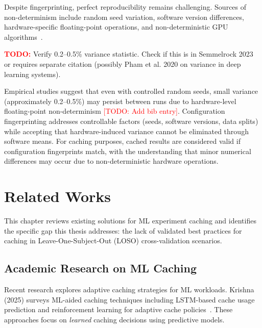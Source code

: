 \documentclass{imc-inf} %
\begin{document}
Despite fingerprinting, perfect reproducibility remains challenging. Sources 
of non-determinism include random seed variation, software version differences, 
hardware-specific floating-point operations, and non-deterministic GPU 
algorithms~\cite{semmelrock2023reproducibility}.

\begin{center}
\colorbox{red!20}{%
\begin{minipage}{0.9\textwidth}
\textcolor{red}{\textbf{TODO:}} Verify 0.2--0.5\% variance statistic. Check if 
this is in Semmelrock 2023 or requires separate citation (possibly Pham et al. 
2020 on variance in deep learning systems).
\end{minipage}
}
\end{center}

Empirical studies suggest that even with controlled random seeds, small 
variance (approximately 0.2--0.5\%) may persist between runs due to hardware-level 
floating-point non-determinism \textcolor{red}{[TODO: Add bib entry]}. Configuration 
fingerprinting addresses controllable factors (seeds, software versions, data 
splits) while accepting that hardware-induced variance cannot be eliminated 
through software means. For caching purposes, cached results are considered 
valid if configuration fingerprints match, with the understanding that minor 
numerical differences may occur due to non-deterministic hardware operations.
\chapter{Related Works}

This chapter reviews existing solutions for ML experiment caching and identifies 
the specific gap this thesis addresses: the lack of validated best practices 
for caching in Leave-One-Subject-Out (LOSO) cross-validation scenarios.

\section{Academic Research on ML Caching}

Recent research explores adaptive caching strategies for ML workloads. Krishna 
(2025) surveys ML-aided caching techniques including LSTM-based cache usage 
prediction and reinforcement learning for adaptive cache policies~\cite{krishna2025cache}. 
These approaches focus on \textit{learned} caching decisions using predictive 
models.
\end{document}
